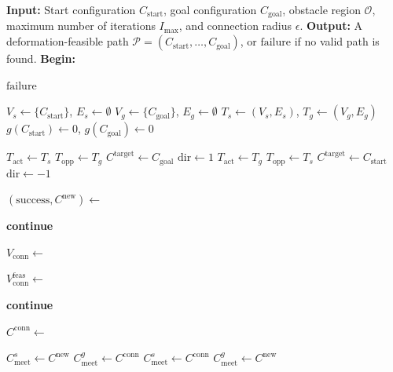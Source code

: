 \documentclass{pas}
\begin{document}
\begin{algorithm}[t]
\small
\caption{Global Cable Routing Planner}
\label{alg:gcr_main}
\begin{algorithmic}[1]
\Statex \textbf{Input:} Start configuration $C_{\mathrm{start}}$, goal
configuration $C_{\mathrm{goal}}$, obstacle region $\mathcal{O}$, maximum
number of iterations $I_{\max}$, and connection radius $\epsilon$.
\Statex \textbf{Output:} A deformation-feasible path
$\mathcal{P}=(C_{\mathrm{start}},\ldots,C_{\mathrm{goal}})$, or
$\mathrm{failure}$ if no valid path is found.
\Statex \textbf{Begin:}

    \State \Return $\mathrm{failure}$
\EndIf

\State $V_s\gets\{C_{\mathrm{start}}\}$, $E_s\gets\emptyset$
\State $V_g\gets\{C_{\mathrm{goal}}\}$, $E_g\gets\emptyset$
\State $T_s\gets(V_s,E_s)$, $T_g\gets(V_g,E_g)$
\State $g(C_{\mathrm{start}})\gets0$, $g(C_{\mathrm{goal}})\gets0$


        \State $T_{\mathrm{act}}\gets T_s$
        \State $T_{\mathrm{opp}}\gets T_g$
        \State $C^{\mathrm{target}}\gets C_{\mathrm{goal}}$
        \State $\mathrm{dir}\gets 1$
    \Else
        \State $T_{\mathrm{act}}\gets T_g$
        \State $T_{\mathrm{opp}}\gets T_s$
        \State $C^{\mathrm{target}}\gets C_{\mathrm{start}}$
        \State $\mathrm{dir}\gets -1$
    \EndIf

    \State $(\mathrm{success},C^{\mathrm{new}})\gets$

        \State \textbf{continue}
    \EndIf

    \State $V_{\mathrm{conn}}\gets$

    \State $V_{\mathrm{conn}}^{\mathrm{feas}}\gets$

        \State \textbf{continue}
    \EndIf

    \State $C^{\mathrm{conn}}\gets$

        \State $C_{\mathrm{meet}}^{s}\gets C^{\mathrm{new}}$
        \State $C_{\mathrm{meet}}^{g}\gets C^{\mathrm{conn}}$
    \Else
        \State $C_{\mathrm{meet}}^{s}\gets C^{\mathrm{conn}}$
        \State $C_{\mathrm{meet}}^{g}\gets C^{\mathrm{new}}$
    \EndIf


\end{algorithmic}
\end{algorithm}
\end{document}
